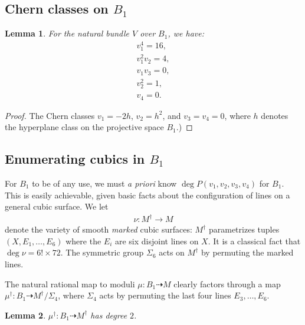 \documentclass[12 pt]{amsart}
\newtheorem{lemma}{Lemma}[section]
\newcommand{\<}{\left\langle}
\renewcommand{\>}{\right\rangle}
\begin{document}
\subsection{Chern classes on $B_1$}
\label{sec:chern-classes-b_1}

\begin{lemma}
  \label{lemma:chernB1}
  For the natural bundle $V$ over $B_1$, we have:
  \begin{align}\nonumber
    v_{1}^{4} = 16,\\\nonumber
    v_{1}^{2}v_{2} = 4,\\\nonumber
    v_{1}v_{3} =0,\\\nonumber
    v_2^{2} = 1,\\\nonumber
    v_{4} = 0.
  \end{align}
\end{lemma}

\begin{proof}
The Chern classes $v_{1} = -2h$, $v_{2}=h^2$, and $v_{3}= v_{4}=0$,
where $h$ denotes the hyperplane class on the projective space $B_1$.)
  
\end{proof}

\subsection{Enumerating cubics in $B_1$}
\label{sec:enum-cubics-b_1}


For $B_1$ to be of any use, we must {\sl a priori} know
$\deg P(v_{1},v_{2},v_{3},v_{4})$ for $B_1$. This is easily
achievable, given basic facts about the configuration of lines on a
general cubic surface. We let
\begin{align}
  \label{eq:nu}
  \nu: M^{\dagger} \to M
  \end{align}
  denote the variety of smooth {\sl marked} cubic surfaces:
  $M^{\dagger}$ parametrizes tuples $(X, E_{1}, \dots, E_{6})$ where
  the $E_{i}$ are six disjoint lines on $X$. It is a classical fact
  that $\deg \nu = 6! \times 72$. The symmetric group $\Sigma_6$ acts
  on $M^{\dagger}$ by permuting the marked lines.

  The natural rational map to moduli $\mu : B_1 \dashrightarrow M$
  clearly factors through a map
  $\mu^{\dagger}: B_1 \dashrightarrow M^{\dagger}/\Sigma_{4}$, where
  $\Sigma_{4}$ acts by permuting the last four lines
  $E_{3}, \dots, E_{6}$.

  \begin{lemma}
    \label{lemma:degreemudaggerB1}
    $\mu^{\dagger}: B_1 \dashrightarrow M^{\dagger}$ has degree $2$.
  \end{lemma}
\end{document}
